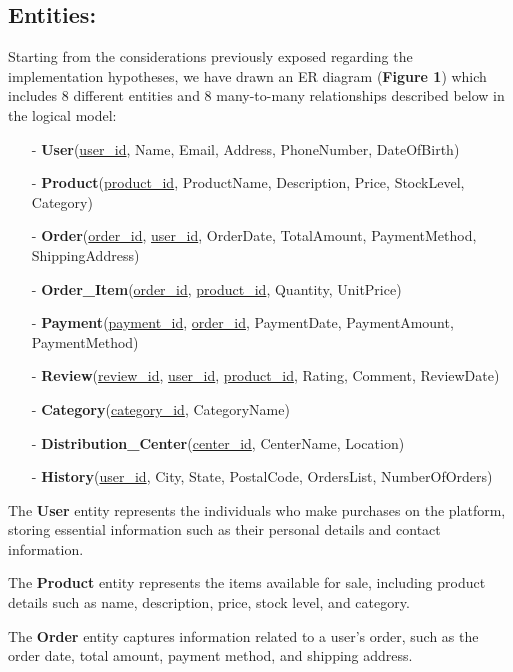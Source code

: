 \documentclass[a4paper,12pt]{article}
\begin{document}
  \subsection{Entities:}
    \par Starting from the considerations previously exposed regarding the implementation hypotheses, we have drawn an ER diagram (\textbf{Figure 1}) which includes 8 different entities and 8 many-to-many relationships described below in the logical model: \par
    \begin{itemize}[noitemsep]
    \item[-]	\textbf{User}(\underline{user\_id}, Name, Email, Address, PhoneNumber, DateOfBirth)
    \item[-]	\textbf{Product}(\underline{product\_id}, ProductName, Description, Price, StockLevel, Category)
    \item[-]	\textbf{Order}(\underline{order\_id}, \underline{user\_id}, OrderDate, TotalAmount, PaymentMethod, ShippingAddress)
    \item[-]	\textbf{Order\_Item}(\underline{order\_id}, \underline{product\_id}, Quantity, UnitPrice)
    \item[-]	\textbf{Payment}(\underline{payment\_id}, \underline{order\_id}, PaymentDate, PaymentAmount, PaymentMethod)
    \item[-]	\textbf{Review}(\underline{review\_id}, \underline{user\_id}, \underline{product\_id}, Rating, Comment, ReviewDate)
    \item[-]	\textbf{Category}(\underline{category\_id}, CategoryName)
    \item[-]	\textbf{Distribution\_Center}(\underline{center\_id}, CenterName, Location)
    \item[-]	\textbf{History}(\underline{user\_id}, City, State, PostalCode, OrdersList, NumberOfOrders)
    \end{itemize} \par

    The \textbf{User} entity represents the individuals who make purchases on the platform, storing essential information such as their personal details and contact information.

    The \textbf{Product} entity represents the items available for sale, including product details such as name, description, price, stock level, and category.

    The \textbf{Order} entity captures information related to a user’s order, such as the order date, total amount, payment method, and shipping address.
\end{document}
